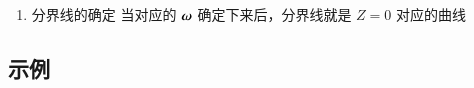 \documentclass[11pt]{ctexart}
\newcommand{\bm}[1]{\mbox{\boldmath{$#1$}}}
\begin{document}
\begin{enumerate}
\begin{enumerate}
\begin{lstlisting}
\begin{equation}
  \nabla{}\mathcal{l} = \sum_{i=1}^N\frac{\partial}{\partial{}{\bm \omega}_i}{\bm i}
  \end{equation}
\end{lstlisting}
其中 \({\bm i}\) 表示沿 \({\bm \omega}_i\) 轴方向的单位向量， \(N\) 表示空间维数
\item 对于偏导 \$\frac{\partial}\{\(\partial\)\{\bm \(\omega\)\}\(_{\text{i}}\)\}\$，如果采用 \texttt{sigmoid} 函数表示 \$h(\{\bm \(\omega\)\})\$，
那么数学上可以对偏导数推导如下结果：
\lstset{language=[LaTeX]TeX,label= ,caption= ,captionpos=b,numbers=none}
\begin{lstlisting}
\begin{equation}
  \frac{\partial}{\partial{}{\bm \omega}_j}\mathcal{l}({\bm \omega}) = \sum(y-h_{{\bm \omega}}({\bm x})){\bm x}_j
\end{equation}
\end{lstlisting}
\end{enumerate}
\item 分界线的确定
\label{sec:orgheadline54}
当对应的 \({\bm \omega}\) 确定下来后，分界线就是 \(Z=0\) 对应的曲线
\end{enumerate}
\subsection{示例}
\label{sec:orgheadline65}
\end{document}
